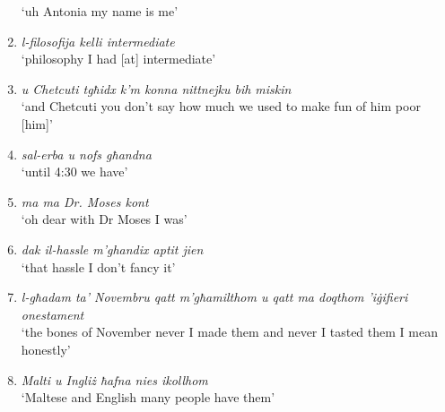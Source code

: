 \documentclass[output=paper]{LSP/langsci}
\begin{document}
\begin{enumerate}
`uh Antonia my name is me' 
\item {\em  l-filosofija kelli intermediate}\\
`philosophy I had [at] intermediate'
\item {\em  u Chetcuti tgħidx k'm konna nittnejku bih miskin}\\
`and Chetcuti you don’t say how much we used to make fun of him poor [him]'
\item {\em  sal-erba u nofs għandna}\\
`until 4:30 we have'
\item {\em  ma ma Dr. Moses kont}\\
  `oh dear with Dr Moses I was'
\item {\em  dak il-hassle m'ghandix aptit jien}\\
`that hassle I don’t fancy it'
\item {\em  l-għadam ta’  Novembru qatt  m'għamilthom u qatt ma doqthom 'iġifieri onestament}\\
`the bones of November never I made them and never I tasted them I mean honestly'
\item {\em  Malti u Ingliż ħafna nies ikollhom}\\
`Maltese and English many people have them' 
\end{enumerate}

\sloppy
\printbibliography[heading=subbibliography,notkeyword=this] 
\end{document}
